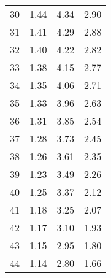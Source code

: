 \begin{longtable}[c]{cccc}
	30                        & 1.44                           & 4.34                                      & 2.90                         \\
	31                        & 1.41                           & 4.29                                      & 2.88                         \\
	32                        & 1.40                           & 4.22                                      & 2.82                         \\
	33                        & 1.38                           & 4.15                                      & 2.77                         \\
	34                        & 1.35                           & 4.06                                      & 2.71                         \\
	35                        & 1.33                           & 3.96                                      & 2.63                         \\
	36                        & 1.31                           & 3.85                                      & 2.54                         \\
	37                        & 1.28                           & 3.73                                      & 2.45                         \\
	38                        & 1.26                           & 3.61                                      & 2.35                         \\
	39                        & 1.23                           & 3.49                                      & 2.26                         \\
	40                        & 1.25                           & 3.37                                      & 2.12                         \\
	41                        & 1.18                           & 3.25                                      & 2.07                         \\
	42                        & 1.17                           & 3.10                                      & 1.93                         \\
	43                        & 1.15                           & 2.95                                      & 1.80                         \\
	44                        & 1.14                           & 2.80                                      & 1.66                         \\

\end{longtable}
